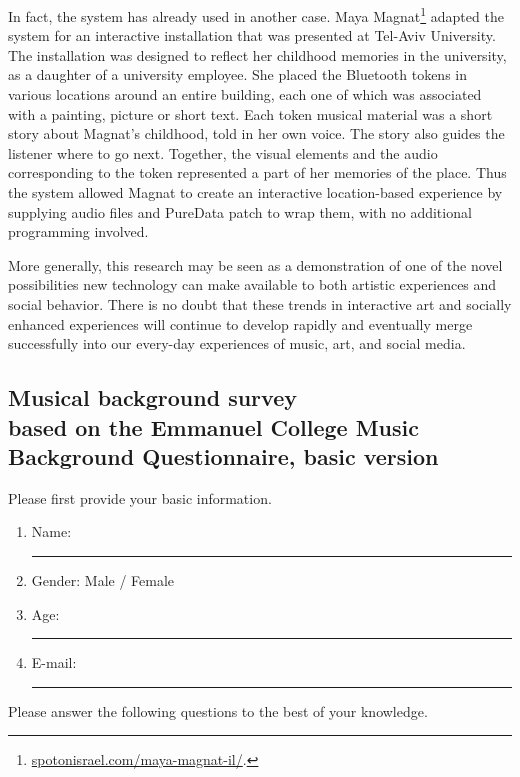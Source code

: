 \documentclass[a4paper,11pt]{article}
\newcommand{\myunderline}{\rule{2in}{.5pt}}
\begin{document}
{In fact, the system has already used in another case.
Maya Magnat\footnote{\href{http://spotonisrael.com/maya-magnat-il/}{spotonisrael.com/maya-magnat-il/}.} adapted the system for an interactive installation that was presented at Tel-Aviv University.
The installation was designed to reflect her childhood memories in the university, as a daughter of a university employee.
She placed the Bluetooth tokens in various locations around an entire building, each one of which was associated with a painting, picture or short text.
Each token musical material was a short story about Magnat's childhood, told in her own voice.
The story also guides the listener where to go next.
Together, the visual elements and the audio corresponding to the token represented a part of her memories of the place.
Thus the system allowed Magnat to create an interactive location-based experience by supplying audio files and PureData patch to wrap them, with no additional programming involved.

More generally, this research may be seen as a demonstration of one of the novel possibilities new technology can make available to both artistic experiences and social behavior.
There is no doubt that these trends in interactive art and socially enhanced experiences will continue to develop rapidly and eventually merge successfully into our every-day experiences of music, art, and social media.

\sloppy  %
\printbibliography[title={Bibliography}]

\begin{appendices}

\section[Musical background survey]{Musical background survey\\
	{\normalsize based on the Emmanuel College Music Background Questionnaire, basic version}}

Please first provide your basic information.

\begin{enumerate}
	\item Name: \myunderline
	\item Gender: Male / Female
	\item Age: \myunderline
	\item E-mail: \myunderline
\end{enumerate}
Please answer the following questions to the best of your knowledge.
\begin{enumerate}[resume]


\end{enumerate}
\end{appendices}}
\end{document}
